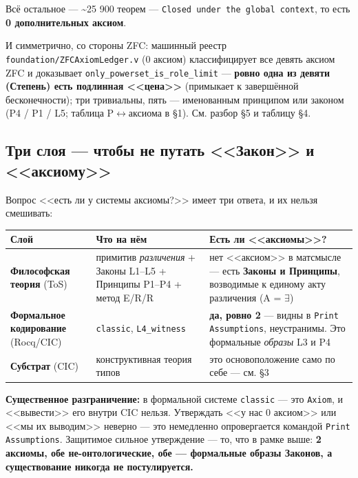 \documentclass[11pt,a4paper]{article}
\begin{document}
Всё остальное --- \textasciitilde{}25 900 теорем --- \texttt{Closed under the global context}, то есть \textbf{0 дополнительных аксиом}.

И симметрично, со стороны ZFC: машинный реестр \texttt{foundation/\allowbreak{}ZFCAxiom\allowbreak{}Ledger.v} (0 аксиом) классифицирует все девять аксиом ZFC и доказывает \texttt{only\_\allowbreak{}powerset\_\allowbreak{}is\_\allowbreak{}role\_\allowbreak{}limit} --- \textbf{ровно одна из девяти (Степень) есть подлинная <<цена>>} (примыкает к завершённой бесконечности); три тривиальны, пять --- именованным принципом или законом (P4 / P1 / L5; таблица P$\leftrightarrow$аксиома в \S{}1). См. разбор \S{}5 и таблицу \S{}4.

\subsection{Три слоя --- чтобы не путать <<Закон>> и <<аксиому>>}

Вопрос <<есть ли у системы аксиомы?>> имеет три ответа, и их нельзя смешивать:

{\footnotesize\setlength{\tabcolsep}{4pt}\renewcommand{\arraystretch}{1.2}\begin{tabularx}{\linewidth}{|X|X|X|}
\hline
\textbf{Слой} & \textbf{Что на нём} & \textbf{Есть ли <<аксиомы>>?} \\ \hline
\textbf{Философская теория} (ToS) & примитив \emph{различения} + Законы L1--L5 + Принципы P1--P4 + метод E/R/R & нет <<аксиом>> в матсмысле --- есть \textbf{Законы и Принципы}, возводимые к единому акту различения (A = $\exists$) \\ \hline
\textbf{Формальное кодирование} (Rocq/CIC) & \texttt{classic}, \texttt{L4\_\allowbreak{}witness} & \textbf{да, ровно 2} --- видны в \texttt{Print Assumptions}, неустранимы. Это формальные \emph{образы} L3 и P4 \\ \hline
\textbf{Субстрат} (CIC) & конструктивная теория типов & это основоположение само по себе --- см. \S{}3 \\ \hline
\end{tabularx}}

\textbf{Существенное разграничение:} в формальной системе \texttt{classic} --- это \texttt{Axiom}, и <<вывести>> его внутри CIC нельзя. Утверждать <<у нас 0 аксиом>> или <<мы их выводим>> неверно --- это немедленно опровергается командой \texttt{Print Assumptions}. Защитимое сильное утверждение --- то, что в рамке выше: \textbf{2 аксиомы, обе не-онтологические, обе --- формальные образы Законов, а существование никогда не постулируется.}
\end{document}

